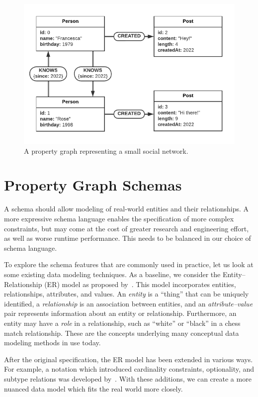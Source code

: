 \documentclass{report}
\theoremstyle{definition}
\begin{document}
\begin{figure}[t]
  \centering
  \includegraphics{figures/pg.pdf}
  \caption{A property graph representing a small social network.}
  \label{fig:pg}
\end{figure}

\chapter{Property Graph Schemas}
\label{ch:pg-schema}

A schema should allow modeling of real-world entities and their relationships. A more expressive schema language enables the specification of more complex constraints, but may come at the cost of greater research and engineering effort, as well as worse runtime performance. This needs to be balanced in our choice of schema language.

To explore the schema features that are commonly used in practice, let us look at some existing data modeling techniques. As a baseline, we consider the Entity--Relationship (ER) model as proposed by~\citet{chen1976entity}. This model incorporates entities, relationships, attributes, and values. An \emph{entity} is a ``thing'' that can be uniquely identified, a \emph{relationship} is an association between entities, and an \emph{attribute--value} pair represents information about an entity or relationship. Furthermore, an entity may have a \emph{role} in a relationship, such as ``white'' or ``black'' in a chess match relationship. These are the concepts underlying many conceptual data modeling methods in use today.

After the original specification, the ER model has been extended in various ways. For example, a notation which introduced cardinality constraints, optionality, and subtype relations was developed by~\citet{barker1990entity}. With these additions, we can create a more nuanced data model which fits the real world more closely.
\end{document}
